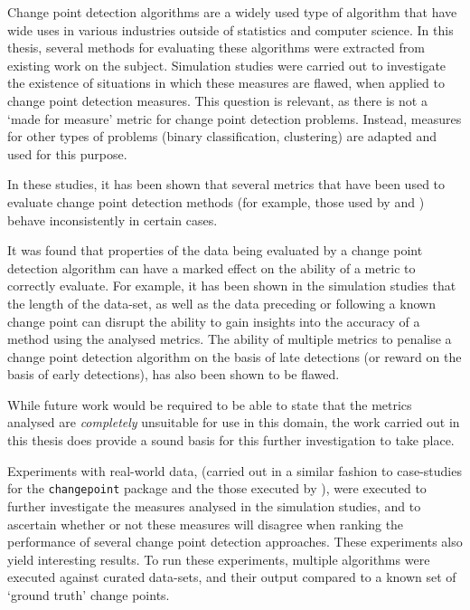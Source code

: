 \documentclass[../main.tex]{subfiles}
\begin{document}
Change point detection algorithms are a widely used type of algorithm that have wide uses in various industries outside of statistics and computer science. In this thesis, several methods for evaluating these algorithms were extracted from existing work on the subject. Simulation studies were carried out to investigate the existence of situations in which these measures are flawed, when applied to change point detection measures. This question is relevant, as there is not a `made for measure' metric for change point detection problems. Instead, measures for other types of problems (binary classification, clustering) are adapted and used for this purpose.

In these studies, it has been shown that several metrics that have been used to evaluate change point detection methods (for example, those used by \citeauthor{Buntain2014} \cite{Buntain2014} and \citeauthor{Matteson2012} \cite{Matteson2012}) behave inconsistently in certain cases.

It was found that properties of the data being evaluated by a change point detection algorithm can have a marked effect on the ability of a metric to correctly evaluate. For example, it has been shown in the simulation studies that the length of the data-set, as well as the data preceding or following a known change point can disrupt the ability to gain insights into the accuracy of a method using the analysed metrics. The ability of multiple metrics to penalise a change point detection algorithm on the basis of late detections (or reward on the basis of early detections), has also been shown to be flawed.

While future work would be required to be able to state that the metrics analysed are \emph{completely} unsuitable for use in this domain, the work carried out in this thesis does provide a sound basis for this further investigation to take place.

Experiments with real-world data, (carried out in a similar fashion to case-studies for the \texttt{changepoint} package \cite{Killick2014} and the those executed by \citeauthor{Buntain2014} \cite{Buntain2014}), were executed to further investigate the measures analysed in the simulation studies, and to ascertain whether or not these measures will disagree when ranking the performance of several change point detection approaches. These experiments also yield interesting results. To run these experiments, multiple algorithms were executed against curated data-sets, and their output compared to a known set of `ground truth' change points.
\end{document}
